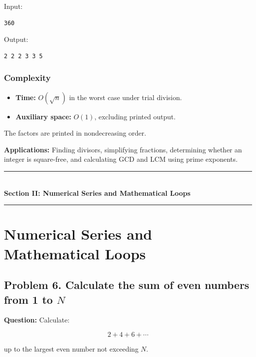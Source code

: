 Input:

\begin{lstlisting}[style=pseudocode]
360
\end{lstlisting}

Output:

\begin{lstlisting}[style=pseudocode]
2 2 2 3 3 5
\end{lstlisting}

\subsubsection{Complexity}

\begin{itemize}
    \item \textbf{Time:} $O(\sqrt n)$ in the worst case under trial division.
    \item \textbf{Auxiliary space:} $O(1)$, excluding printed output.
\end{itemize}

The factors are printed in nondecreasing order.

\textbf{Applications:} Finding divisors, simplifying fractions, determining whether an integer is square-free, and calculating GCD and LCM using prime exponents.


\newpage
\begin{center}
\vspace{0.5em}
{\color{primary}\rule{0.45\textwidth}{1.2pt}}\\[4pt]
{\Large\bfseries\color{primary} Section II: Numerical Series and Mathematical Loops}\\[2pt]
{\color{primary}\rule{0.45\textwidth}{1.2pt}}
\vspace{0.5em}
\end{center}

\section{Numerical Series and Mathematical Loops}


\subsection{\textbf{Problem 6. Calculate the sum of even numbers from 1 to }$N$}

\textbf{Question:} Calculate:


\[
2+4+6+\cdots
\]


up to the largest even number not exceeding $N$.

